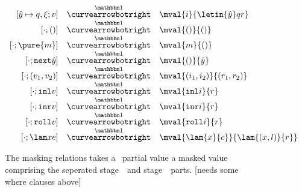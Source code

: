 \begin{figure}
\begin{abstrsyn}
\[\begin{array}{rll}
[\hat y \mapsto q,\xi;v]
  &\vsplito& \mval 
  {i}
  {\letin {\hat y} q {r}} \\\relax
[\cdot;()]
  &\vsplito& \mval 
  {()}
  {()} \\\relax
[\cdot;\pure{m}]
  &\vsplito& \mval 
  {m}
  {()} \\\relax
[\cdot;\next{\hat y}]
  &\vsplito& \mval 
  {()}
  {\hat y} \\\relax
[\cdot;(v_1,v_2)]
  &\vsplito& \mval 
  {(i_1,i_2)}
  {(r_1,r_2)} \\\relax
[\cdot;\inl{v}]
  &\vsplito& \mval 
  {\inl{i}}
  {r} \\\relax
[\cdot;\inr{v}]
  &\vsplito& \mval 
  {\inr{i}}
  {r} \\\relax
[\cdot;\roll{v}]
  &\vsplito& \mval 
  {\roll{i}}
  {r} \\\relax
[\cdot;\lam xe]
  &\vsplito& \mval 
  {\lam {x} {c}}
  {\lam {(x,l)} {r}}
\end{array}\]
\end{abstrsyn}
\caption{The masking relations takes a \lang\ partial value a masked value
comprising the seperated stage~\bbone\ and stage~\bbtwo\ parts. 
[needs some where clauses above]}
\label{fig:valMask}
\end{figure}

%

